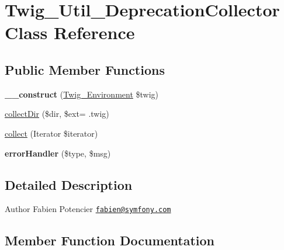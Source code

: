 \hypertarget{classTwig__Util__DeprecationCollector}{}\section{Twig\+\_\+\+Util\+\_\+\+Deprecation\+Collector Class Reference}
\label{classTwig__Util__DeprecationCollector}
\subsection*{Public Member Functions}
\begin{DoxyCompactItemize}
\item 
{\bfseries \+\_\+\+\_\+construct} (\hyperlink{classTwig__Environment}{Twig\+\_\+\+Environment} \$twig)\hypertarget{classTwig__Util__DeprecationCollector_ab02b255b93896e858112f8b1542824e3}{}\label{classTwig__Util__DeprecationCollector_ab02b255b93896e858112f8b1542824e3}

\item 
\hyperlink{classTwig__Util__DeprecationCollector_ae5b5baeadeab3820574d6c1d26e757c0}{collect\+Dir} (\$dir, \$ext= \textquotesingle{}.twig\textquotesingle{})
\item 
\hyperlink{classTwig__Util__DeprecationCollector_a6d9f2c3329ecc2ad63304d4b1bc71694}{collect} (Iterator \$iterator)
\item 
{\bfseries error\+Handler} (\$type, \$msg)\hypertarget{classTwig__Util__DeprecationCollector_a75dd106f39f032447b46c2c570986d15}{}\label{classTwig__Util__DeprecationCollector_a75dd106f39f032447b46c2c570986d15}

\end{DoxyCompactItemize}


\subsection{Detailed Description}
\begin{DoxyAuthor}{Author}
Fabien Potencier \href{mailto:fabien@symfony.com}{\tt fabien@symfony.\+com} 
\end{DoxyAuthor}


\subsection{Member Function Documentation}
